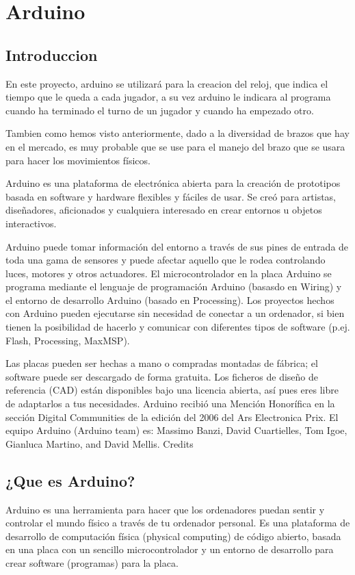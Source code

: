 \documentclass[12pt,a4paper]{report}
\begin{document}
\chapter{Arduino}
\section{Introduccion}
En este proyecto, arduino se utilizará para la creacion del reloj, que indica el tiempo que le queda a cada jugador, a su vez arduino le indicara al programa cuando ha terminado el turno de un jugador y cuando ha empezado otro.

Tambien como hemos visto anteriormente, dado a la diversidad de brazos que hay en el mercado, es muy probable que se use para el manejo del brazo que se usara para hacer los movimientos físicos.

Arduino es una plataforma de electrónica abierta para la creación de prototipos basada en software y hardware flexibles y fáciles de usar. Se creó para artistas, diseñadores, aficionados y cualquiera interesado en crear entornos u objetos interactivos.

Arduino puede tomar información del entorno a través de sus pines de entrada de toda una gama de sensores y puede afectar aquello que le rodea controlando luces, motores y otros actuadores. El microcontrolador en la placa Arduino se programa mediante el lenguaje de programación Arduino (basasdo en Wiring) y el entorno de desarrollo Arduino (basado en Processing). Los proyectos hechos con Arduino pueden ejecutarse sin necesidad de conectar a un ordenador, si bien tienen la posibilidad de hacerlo y comunicar con diferentes tipos de software (p.ej. Flash, Processing, MaxMSP).

Las placas pueden ser hechas a mano o compradas montadas de fábrica; el software puede ser descargado de forma gratuita. Los ficheros de diseño de referencia (CAD) están disponibles bajo una licencia abierta, así pues eres libre de adaptarlos a tus necesidades.
Arduino recibió una Mención Honorífica en la sección Digital Communities de la edición del 2006 del Ars Electronica Prix. El equipo Arduino (Arduino team) es: Massimo Banzi, David Cuartielles, Tom Igoe, Gianluca Martino, and David Mellis. Credits

\section{¿Que es Arduino?}

Arduino es una herramienta para hacer que los ordenadores puedan sentir y controlar el mundo físico a través de tu ordenador personal. Es una plataforma de desarrollo de computación física (physical computing) de código abierto, basada en una placa con un sencillo microcontrolador y un entorno de desarrollo para crear software (programas) para la placa.
\end{document}
